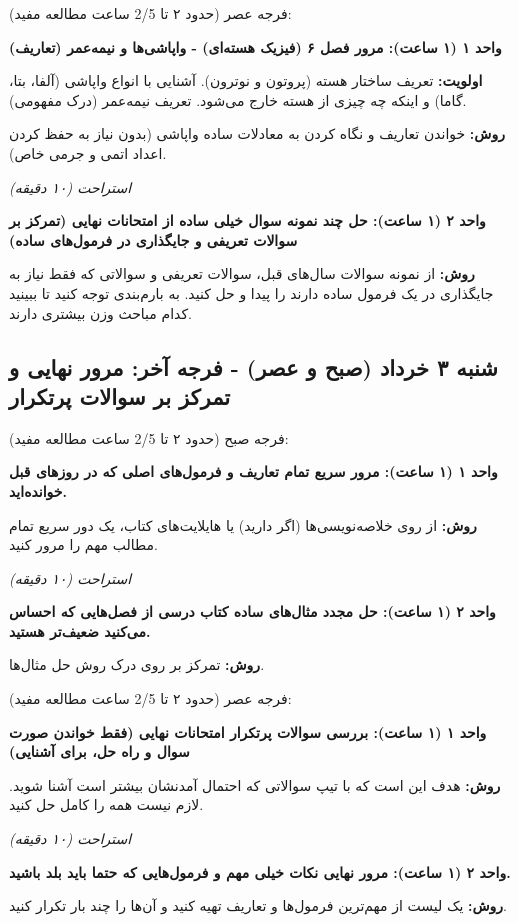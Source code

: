 \documentclass[12pt]{article}
\newcommand{\unithead}[1]{\par\vspace{1ex}\noindent\textbf{#1}\par\nopagebreak[4]\vspace{0.5ex}}
\newcommand{\休息}[1]{\par\centering\textit{#1}\par\vspace{1ex}} %
\begin{document}
\vspace{1em}
فرجه عصر (حدود ۲ تا 2/5 ساعت مطالعه مفید):

\unithead{واحد ۱ (۱ ساعت): مرور فصل ۶ (فیزیک هسته‌ای) - واپاشی‌ها و نیمه‌عمر (تعاریف)}
\noindent\textbf{اولویت: }تعریف ساختار هسته (پروتون و نوترون). آشنایی با انواع واپاشی (آلفا، بتا، گاما) و اینکه چه چیزی از هسته خارج می‌شود. تعریف نیمه‌عمر (درک مفهومی).
\par\noindent\textbf{روش: }خواندن تعاریف و نگاه کردن به معادلات ساده واپاشی (بدون نیاز به حفظ کردن اعداد اتمی و جرمی خاص).

\休息{استراحت (۱۰ دقیقه)}

\unithead{واحد ۲ (۱ ساعت): حل چند نمونه سوال خیلی ساده از امتحانات نهایی (تمرکز بر سوالات تعریفی و جایگذاری در فرمول‌های ساده)}
\noindent\textbf{روش: }از نمونه سوالات سال‌های قبل، سوالات تعریفی و سوالاتی که فقط نیاز به جایگذاری در یک فرمول ساده دارند را پیدا و حل کنید. به بارم‌بندی توجه کنید تا ببینید کدام مباحث وزن بیشتری دارند.

\subsection*{شنبه ۳ خرداد (صبح و عصر) - فرجه آخر: مرور نهایی و تمرکز بر سوالات پرتکرار}
فرجه صبح (حدود ۲ تا 2/5 ساعت مطالعه مفید):

\unithead{واحد ۱ (۱ ساعت): مرور سریع تمام تعاریف و فرمول‌های اصلی که در روزهای قبل خوانده‌اید.}
\noindent\textbf{روش: }از روی خلاصه‌نویسی‌ها (اگر دارید) یا هایلایت‌های کتاب، یک دور سریع تمام مطالب مهم را مرور کنید.

\休息{استراحت (۱۰ دقیقه)}

\unithead{واحد ۲ (۱ ساعت): حل مجدد مثال‌های ساده کتاب درسی از فصل‌هایی که احساس می‌کنید ضعیف‌تر هستید.}
\noindent\textbf{روش: }تمرکز بر روی درک روش حل مثال‌ها.

\vspace{1em}
فرجه عصر (حدود ۲ تا 2/5 ساعت مطالعه مفید):

\unithead{واحد ۱ (۱ ساعت): بررسی سوالات پرتکرار امتحانات نهایی (فقط خواندن صورت سوال و راه حل، برای آشنایی)}
\noindent\textbf{روش: }هدف این است که با تیپ سوالاتی که احتمال آمدنشان بیشتر است آشنا شوید. لازم نیست همه را کامل حل کنید.

\休息{استراحت (۱۰ دقیقه)}

\unithead{واحد ۲ (۱ ساعت): مرور نهایی نکات خیلی مهم و فرمول‌هایی که حتما باید بلد باشید.}
\noindent\textbf{روش: }یک لیست از مهم‌ترین فرمول‌ها و تعاریف تهیه کنید و آن‌ها را چند بار تکرار کنید.
\end{document}
